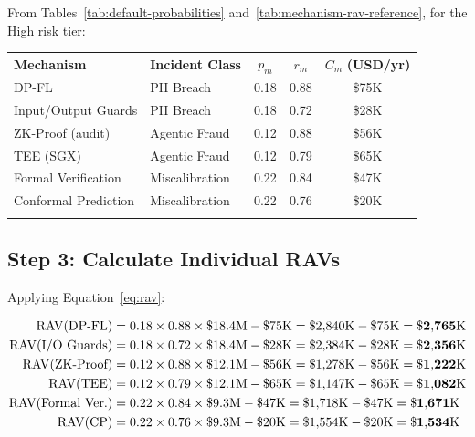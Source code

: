 From Tables~\ref{tab:default-probabilities}
and~\ref{tab:mechanism-rav-reference}, for the High risk tier:

\begin{table}[ht]
\centering
\small
\begin{tabular}{p{3.2cm}p{2.5cm}ccc}
\hline\noalign{\smallskip}
\textbf{Mechanism}
  & \textbf{Incident Class}
  & $p_m$
  & $r_m$
  & $C_m$ \textbf{(USD/yr)} \\
\noalign{\smallskip}\svhline\noalign{\smallskip}
DP-FL               & PII Breach     & 0.18 & 0.88 & \$75K \\
Input/Output Guards & PII Breach     & 0.18 & 0.72 & \$28K \\
ZK-Proof (audit)    & Agentic Fraud  & 0.12 & 0.88 & \$56K \\
TEE (SGX)           & Agentic Fraud  & 0.12 & 0.79 & \$65K \\
Formal Verification & Miscalibration & 0.22 & 0.84 & \$47K \\
Conformal Prediction& Miscalibration & 0.22 & 0.76 & \$20K \\
\noalign{\smallskip}\hline\noalign{\smallskip}
\end{tabular}
\end{table}

\subsection{Step 3: Calculate Individual RAVs}
\label{subsec:step3-rav}

Applying Equation~\eqref{eq:rav}:

\begin{align}
  \mathrm{RAV}(\text{DP-FL})
    &= 0.18 \times 0.88 \times \$18.4\text{M} - \$75\text{K}
    = \$2{,}840\text{K} - \$75\text{K}
    = \mathbf{\$2{,}765\text{K}} \notag\\
  \mathrm{RAV}(\text{I/O Guards})
    &= 0.18 \times 0.72 \times \$18.4\text{M} - \$28\text{K}
    = \$2{,}384\text{K} - \$28\text{K}
    = \mathbf{\$2{,}356\text{K}} \notag\\
  \mathrm{RAV}(\text{ZK-Proof})
    &= 0.12 \times 0.88 \times \$12.1\text{M} - \$56\text{K}
    = \$1{,}278\text{K} - \$56\text{K}
    = \mathbf{\$1{,}222\text{K}} \notag\\
  \mathrm{RAV}(\text{TEE})
    &= 0.12 \times 0.79 \times \$12.1\text{M} - \$65\text{K}
    = \$1{,}147\text{K} - \$65\text{K}
    = \mathbf{\$1{,}082\text{K}} \notag\\
  \mathrm{RAV}(\text{Formal Ver.})
    &= 0.22 \times 0.84 \times \$9.3\text{M} - \$47\text{K}
    = \$1{,}718\text{K} - \$47\text{K}
    = \mathbf{\$1{,}671\text{K}} \notag\\
  \mathrm{RAV}(\text{CP})
    &= 0.22 \times 0.76 \times \$9.3\text{M} - \$20\text{K}
    = \$1{,}554\text{K} - \$20\text{K}
    = \mathbf{\$1{,}534\text{K}} \notag
\end{align}

